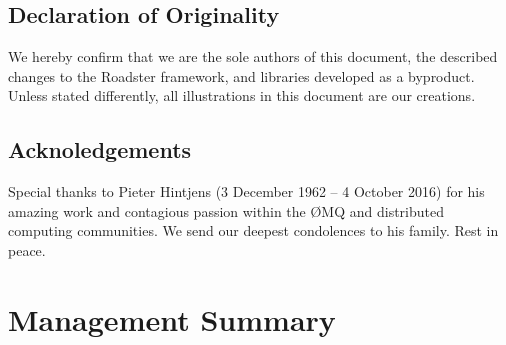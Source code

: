 \documentclass[a4paper]{report}
\newcommand\zmq{{\O}MQ\xspace}
\begin{document}
\begin{abstract}




\end{abstract}

\chapter*{Declaration of Originality}
We hereby confirm that we are the sole authors of this document, the
described changes to the Roadster framework, and libraries developed as a
byproduct. Unless stated differently, all illustrations in this document are
our creations.

%

\chapter*{Acknoledgements}

Special thanks to Pieter Hintjens {\textdagger} (3 December 1962 -- 4 October
2016) for his amazing work and contagious passion within the \zmq and
distributed computing communities. We send our deepest condolences to his
family. Rest in peace.

\tableofcontents
\listoffigures
\listoftables
\lstlistoflistings

\pagebreak
{}
\setcounter{page}{1}
\setcounter{secnumdepth}{4}

\part{Management Summary}\label{part:mgmtsummary}

\end{document}
